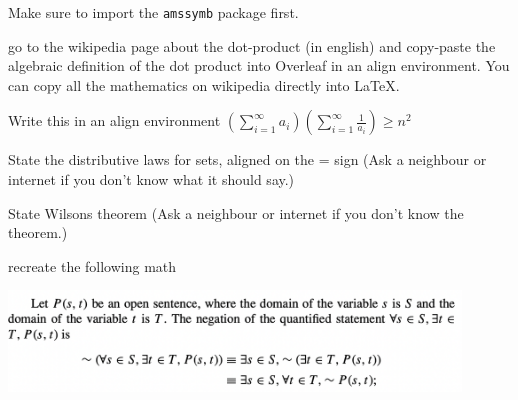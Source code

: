 \documentclass[a4paper, 11pt]{article}
\begin{document}
\begin{compactenum}
Make sure to import the \texttt{amssymb} package first.
\item go to the wikipedia page about the dot-product (in english) and copy-paste the algebraic definition of the dot product into Overleaf in an align environment. You can copy all the mathematics on wikipedia directly into LaTeX.
\item Write this in an align environment $\left(\sum_{i=1}^\infty a_i\right)\left(\sum_{i=1}^\infty\frac{1}{a_i}\right)\geq n^2$
\item State the distributive laws for sets, aligned on the = sign (Ask a neighbour or internet if you don't know what it should say.)
\item State Wilsons theorem (Ask a neighbour or internet if you don't know the theorem.)
\item recreate the following math
\end{compactenum}
\includegraphics[width=0.9\textwidth]{plaatje.pdf}
\end{document}
